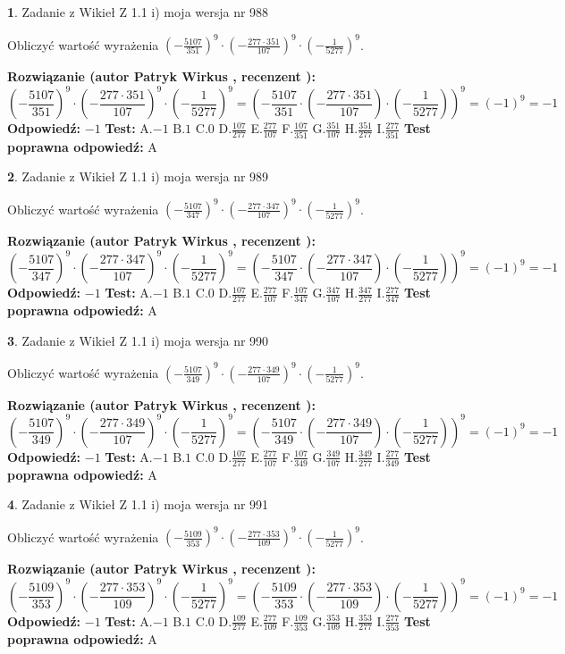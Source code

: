\documentclass[12pt, a4paper]{article}
\theoremstyle{definition} %
\newtheorem{zad}{}
\newcommand{\zadStart}[1]{\begin{zad}#1\newline}
\newcommand{\zadStop}{\end{zad}}
\newcommand{\rozwStart}[2]{\noindent \textbf{Rozwiązanie (autor #1 , recenzent #2): }\newline}
\newcommand{\rozwStop}{\newline}
\newcommand{\odpStart}{\noindent \textbf{Odpowiedź:}\newline}
\newcommand{\odpStop}{\newline}
\newcommand{\testStart}{\noindent \textbf{Test:}\newline}
\newcommand{\testStop}{\newline}
\newcommand{\kluczStart}{\noindent \textbf{Test poprawna odpowiedź:}\newline}
\newcommand{\kluczStop}{\newline}
\begin{document}
\zadStart{Zadanie z Wikieł Z 1.1 i) moja wersja nr 988}

Obliczyć wartość wyrażenia $(-\frac{5107}{351})^{9} \cdot (-\frac{277 \cdot 351}{107})^{9} \cdot (-\frac{1}{5277})^{9}$.
\zadStop
\rozwStart{Patryk Wirkus}{}
$$(-\frac{5107}{351})^{9} \cdot (-\frac{277 \cdot 351}{107})^{9} \cdot (-\frac{1}{5277})^{9} = (-\frac{5107}{351} \cdot (-\frac{277 \cdot 351}{107}) \cdot (-\frac{1}{5277}))^{9} = (-1)^{9} = -1$$
\rozwStop
\odpStart
$-1$
\odpStop
\testStart
A.$-1$ B.$1$ C.$0$ D.$\frac{107}{277}$ E.$\frac{277}{107}$
F.$\frac{107}{351}$ G.$\frac{351}{107}$
H.$\frac{351}{277}$
I.$\frac{277}{351}$
\testStop
\kluczStart
A
\kluczStop



\zadStart{Zadanie z Wikieł Z 1.1 i) moja wersja nr 989}

Obliczyć wartość wyrażenia $(-\frac{5107}{347})^{9} \cdot (-\frac{277 \cdot 347}{107})^{9} \cdot (-\frac{1}{5277})^{9}$.
\zadStop
\rozwStart{Patryk Wirkus}{}
$$(-\frac{5107}{347})^{9} \cdot (-\frac{277 \cdot 347}{107})^{9} \cdot (-\frac{1}{5277})^{9} = (-\frac{5107}{347} \cdot (-\frac{277 \cdot 347}{107}) \cdot (-\frac{1}{5277}))^{9} = (-1)^{9} = -1$$
\rozwStop
\odpStart
$-1$
\odpStop
\testStart
A.$-1$ B.$1$ C.$0$ D.$\frac{107}{277}$ E.$\frac{277}{107}$
F.$\frac{107}{347}$ G.$\frac{347}{107}$
H.$\frac{347}{277}$
I.$\frac{277}{347}$
\testStop
\kluczStart
A
\kluczStop



\zadStart{Zadanie z Wikieł Z 1.1 i) moja wersja nr 990}

Obliczyć wartość wyrażenia $(-\frac{5107}{349})^{9} \cdot (-\frac{277 \cdot 349}{107})^{9} \cdot (-\frac{1}{5277})^{9}$.
\zadStop
\rozwStart{Patryk Wirkus}{}
$$(-\frac{5107}{349})^{9} \cdot (-\frac{277 \cdot 349}{107})^{9} \cdot (-\frac{1}{5277})^{9} = (-\frac{5107}{349} \cdot (-\frac{277 \cdot 349}{107}) \cdot (-\frac{1}{5277}))^{9} = (-1)^{9} = -1$$
\rozwStop
\odpStart
$-1$
\odpStop
\testStart
A.$-1$ B.$1$ C.$0$ D.$\frac{107}{277}$ E.$\frac{277}{107}$
F.$\frac{107}{349}$ G.$\frac{349}{107}$
H.$\frac{349}{277}$
I.$\frac{277}{349}$
\testStop
\kluczStart
A
\kluczStop



\zadStart{Zadanie z Wikieł Z 1.1 i) moja wersja nr 991}

Obliczyć wartość wyrażenia $(-\frac{5109}{353})^{9} \cdot (-\frac{277 \cdot 353}{109})^{9} \cdot (-\frac{1}{5277})^{9}$.
\zadStop
\rozwStart{Patryk Wirkus}{}
$$(-\frac{5109}{353})^{9} \cdot (-\frac{277 \cdot 353}{109})^{9} \cdot (-\frac{1}{5277})^{9} = (-\frac{5109}{353} \cdot (-\frac{277 \cdot 353}{109}) \cdot (-\frac{1}{5277}))^{9} = (-1)^{9} = -1$$
\rozwStop
\odpStart
$-1$
\odpStop
\testStart
A.$-1$ B.$1$ C.$0$ D.$\frac{109}{277}$ E.$\frac{277}{109}$
F.$\frac{109}{353}$ G.$\frac{353}{109}$
H.$\frac{353}{277}$
I.$\frac{277}{353}$
\testStop
\kluczStart
A
\kluczStop
\end{document}
